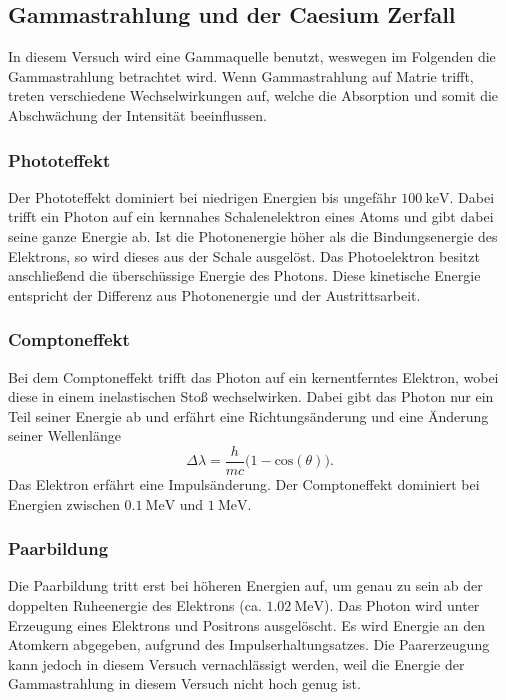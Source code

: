\subsection{Gammastrahlung und der Caesium Zerfall}
\label{subsec:GammaCaesium}
In diesem Versuch wird eine Gammaquelle benutzt, weswegen im Folgenden die Gammastrahlung betrachtet wird. Wenn Gammastrahlung auf Matrie trifft,
treten verschiedene Wechselwirkungen auf, welche die Absorption und somit die Abschwächung der Intensität beeinflussen. 

\subsubsection{Phototeffekt}
\label{subsubsec:Phototeffekt}
Der Phototeffekt dominiert bei niedrigen Energien bis ungefähr $\qty{100}{\kilo\electronvolt}$.
Dabei trifft ein Photon auf ein kernnahes Schalenelektron eines Atoms und gibt dabei seine ganze Energie ab.
Ist die Photonenergie höher als die Bindungsenergie des Elektrons, so wird dieses aus der Schale ausgelöst.
Das Photoelektron besitzt anschließend die überschüssige Energie des Photons. Diese kinetische Energie entspricht der Differenz aus Photonenergie
und der Austrittsarbeit.

\subsubsection{Comptoneffekt}
\label{subsubsec:Comptoneffekt}
Bei dem Comptoneffekt trifft das Photon auf ein kernentferntes Elektron, wobei diese in einem inelastischen Stoß wechselwirken.
Dabei gibt das Photon nur ein Teil seiner Energie ab und erfährt eine Richtungsänderung und eine Änderung seiner Wellenlänge
\begin{equation}
    \Delta \lambda = \frac{h}{m c} \biggl(1 - \text{cos}(\theta)\biggr).
\end{equation}
Das Elektron erfährt eine Impulsänderung.
Der Comptoneffekt dominiert bei Energien zwischen $\qty{0.1}{\mega\electronvolt}$ und $\qty{1}{\mega\electronvolt}$.

\subsubsection{Paarbildung}
\label{subsubsec:Paarbildung}
Die Paarbildung tritt erst bei höheren Energien auf, um genau zu sein ab der doppelten Ruheenergie des Elektrons (ca. $\qty{1.02}{\mega\eV}$).
Das Photon wird unter Erzeugung eines Elektrons und Positrons ausgelöscht.
Es wird Energie an den Atomkern abgegeben, aufgrund des Impulserhaltungsatzes.
Die Paarerzeugung kann jedoch in diesem Versuch vernachlässigt werden, weil die Energie der Gammastrahlung in diesem Versuch nicht hoch genug ist.

